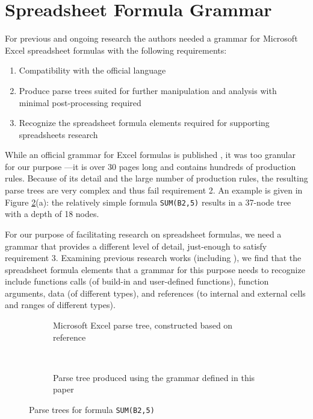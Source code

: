 \documentclass[times]{smrauth}
\begin{document}
\section{Spreadsheet Formula Grammar}
\label{section:grammar}

For previous and ongoing research the authors needed a grammar for Microsoft Excel spreadsheet formulas with the following requirements:

\label{sec:designgoals}
\begin{enumerate}
	\item Compatibility with the official language
	\item Produce parse trees suited for further manipulation and analysis with minimal post-processing required
	\item Recognize the spreadsheet formula elements required for supporting spreadsheets research
\end{enumerate}

While an official grammar for Excel formulas is published \cite{ExcelOfficialGrammar}, it was too granular for our purpose ---it is over 30 pages long and contains hundreds of production rules. Because of its detail and the large number of production rules, the resulting parse trees are very complex and thus fail requirement 2.
An example is given in Figure \ref{figure:parsetrees}(a): the relatively simple formula \texttt{SUM(B2,5)} results in a 37-node tree with a depth of 18 nodes. 

For our purpose of facilitating research on spreadsheet formulas, we need a grammar that provides a different level of detail, just-enough to satisfy requirement 3. Examining previous research works (including \cite{DBLP:conf/icse/HermansPD11,DBLP:conf/icse/HermansPD12, DBLP:conf/icsm/Hermans212, hermans2014bumblebee, badame2012refactoring, Expector}), we find that the spreadsheet formula elements that a grammar for this purpose needs to recognize include functions calls (of build-in and user-defined functions), function arguments, data (of different types), and references (to internal and external cells and ranges of different types).

\begin{figure}
	\centering
	\begin{subfigure}[b]{0.45\textwidth}
		\centering
		\hspace{-2em}
		\scalebox{.7}{
			
		}
		\caption{Microsoft Excel parse tree, constructed based on reference \cite{ExcelOfficialGrammar}}
	\end{subfigure}
	~
	\begin{subfigure}[b]{0.45\textwidth}
		\centering
		\vspace{1em}
		\hspace{-0.5em}
		\scalebox{.7}{
			
		}
		\caption{Parse tree produced using the grammar defined in this paper}
		\label{figure:ourparsetree}
	\end{subfigure}
	\caption{Parse trees for formula \texttt{SUM(B2,5)}}
	\label{figure:parsetrees}
\end{figure}
\end{document}
